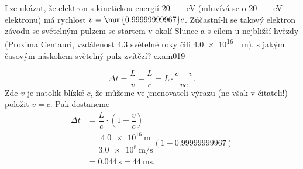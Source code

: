 \begin{fyzexam}{Lze ukázat, že elektron s kinetickou energií
  \protect\SI{20}{\protect\giga\protect\electronvolt} (mluvívá se o
  \protect\SI{20}{\protect\giga\protect\electronvolt}-elektronu) má rychlost \(v = \num{0.999 999
  999 67}c\). Zúčastní-li se takový elektron závodu se světelným pulzem se startem v okolí Slunce a
  s cílem u nejbližší hvězdy (Proxima Centauri, vzdálenost \num{4.3} světelné roky čili
  \protect\SI{4.0e16}{\protect\meter}), s jakým časovým náskokem světelný pulz zvítězí?
  \hfill\cite[s.~1008]{Halliday2001}}{exam019} 

  \begin{equation*}
    \Delta t = \dfrac{L}{v} - \dfrac{L}{c} = L\cdot\dfrac{c-v}{vc}.
  \end{equation*} 
  Zde \(v\) je natolik blízké \(c\), že můžeme ve jmenovateli výrazu (ne však v čitateli!) položit
  \(v = c\). Pak dostaneme
  \begin{align*}
    \Delta t &=\dfrac{L}{c}\cdot\left(1-\dfrac{v}{c}\right)                                      \\
             &=\dfrac{\SI{4.0e16}{\meter}}{\SI{3.0e8}{\meter\per\s}}(1-\num{0.999 999 999 67}) \\
             &=\SI{0.044}{\s} = \SI{44}{\milli\s}.
  \end{align*} 
\end{fyzexam}
